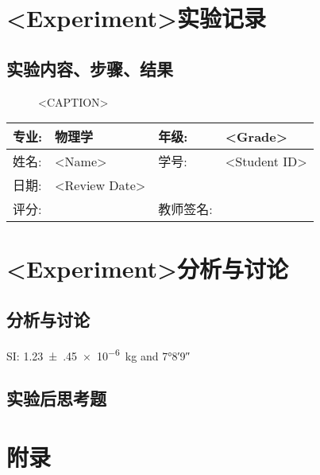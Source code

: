 \documentclass{ctexart}
\newcommand{\experimentname}{<Experiment>}
\newcommand{\student}{<Name>}
\newcommand{\Grade}{<Grade>}
\newcommand{\stuID}{<Student ID>}
\newcommand{\reviewdate}{<Review Date>}
\numberwithin{equation}{section}%
\theoremstyle{ansstyle}
\newcommand{\reviewdata}{%
    \begin{center}
        \begin{tabular}{|p{2cm}|p{4cm}|p{4cm}|p{4cm}|}
            \hline
            专业: & 物理学 & 年级:  & \Grade \\
            \hline
            姓名: & \student & 学号: & \stuID \\
            \hline
            日期: & \reviewdate & & \\
            \hline
            评分: & & 教师签名: & \\
            \hline
        \end{tabular}
    \end{center}%
}
\begin{document}
\section*{\experimentname 实验记录}

\subsection{实验内容、步骤、结果}
\begin{figure}[H]
	\centering
	\caption{<CAPTION>}
\end{figure}

\newpage


\reviewdata

\section*{\experimentname 分析与讨论}


\subsection{分析与讨论}

SI: \SI{1.23(45)e-6}{\kilo\gram} and \ang{7;8;9}

\subsection{实验后思考题}


\appendix

\section{附录}
\end{document}
